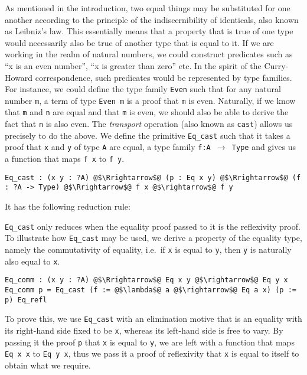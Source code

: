 \documentclass[12pt,twoside,maitrise]{dms}
\theoremstyle{definition}
\numberwithin{equation}{section}
\numberwithin{table}{chapter}
\numberwithin{figure}{chapter}
\newcommand\id[1] {\texttt{#1}}
\newcommand\fn[1] {\texttt{#1}}
\begin{document}
As mentioned in the introduction, two equal things may be substituted for one
another according to the principle of the indiscernibility of identicals, also
known as Leibniz's law. This essentially means that a property that is true of
one type would necessarily also be true of another type that is equal to it. If
we are working in the realm of natural numbers, we could construct predicates
such as ``x is an even number'', ``x is greater than zero'' etc. In the spirit
of the Curry-Howard correspondence, such predicates would be represented by type
families. For instance, we could define the type family \id{Even} such that for
any natural number \id{m}, a term of type \fn{Even m} is a proof that \id{m} is
even. Naturally, if we know that \id{m} and \id{n} are equal and that \id{m} is
even, we should also be able to derive the fact that \id{n} is also even. The
\emph{transport} operation (also known as {\id{cast}}) allows us precisely to do
the above. We define the primitive \id{Eq\_cast} such that it takes a proof that
\id{x} and \id{y} of type \id{A} are equal, a type family \fn{f:A $\rightarrow$
  Type} and gives us a function that maps \fn{f x} to \fn{f y}.

\begin{verbatim}
Eq_cast : (x y : ?A) @$\Rrightarrow$@ (p : Eq x y) @$\Rrightarrow$@ (f : ?A -> Type) @$\Rrightarrow$@ f x @$\rightarrow$@ f y
\end{verbatim}

It has the following reduction rule:

\begin{prooftree*}
  \hypo{\id{p} \simeq{} \id{Eq\_refl}}
  \infer1{\Funapp{\id{Eq\_cast}}{\id{x}}{\id{y}}{\id{p}}{\id{f}}{\id{fx}} \rightsquigarrow{} \id{fx}}
\end{prooftree*}

\id{Eq\_cast} only reduces when the equality proof passed to it is the
reflexivity proof. To illustrate how \id{Eq\_cast} may be used, we derive a
property of the equality type, namely the commutativity of equality, i.e.\ if
\id{x} is equal to \id{y}, then \id{y} is naturally also equal to \id{x}.

\begin{verbatim}
Eq_comm : (x y : ?A) @$\Rrightarrow$@ Eq x y @$\rightarrow$@ Eq y x
Eq_comm p = Eq_cast (f := @$\lambda$@ a @$\rightarrow$@ Eq a x) (p := p) Eq_refl
\end{verbatim}

To prove this, we use \id{Eq\_cast} with an elimination motive that is an
equality with its right-hand side fixed to be \id{x}, whereas its left-hand side
is free to vary. By passing it the proof \id{p} that \id{x} is equal to \id{y},
we are left with a function that maps \fn{Eq x x} to \fn{Eq y x}, thus we pass
it a proof of reflexivity that \id{x} is equal to itself to obtain what we
require.
\end{document}

